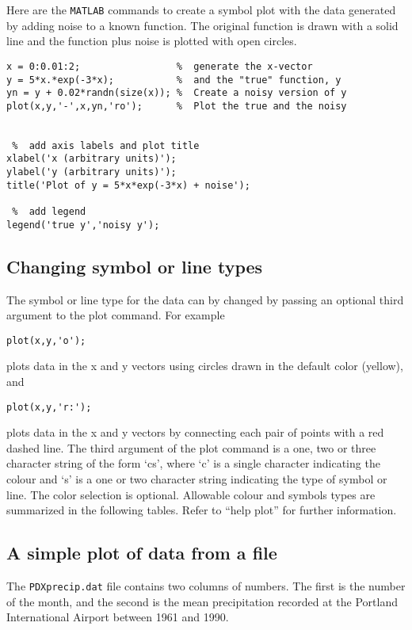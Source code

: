 \documentclass[12pt]{article}
\begin{document}
Here are the \texttt{MATLAB} commands to create a symbol plot with the data generated by adding noise to a known function. The original function is drawn with a solid line and the function plus noise is plotted with open circles.

\begin{verbatim}
x = 0:0.01:2;                 %  generate the x-vector
y = 5*x.*exp(-3*x);           %  and the "true" function, y
yn = y + 0.02*randn(size(x)); %  Create a noisy version of y
plot(x,y,'-',x,yn,'ro');      %  Plot the true and the noisy


 %  add axis labels and plot title
xlabel('x (arbitrary units)');
ylabel('y (arbitrary units)');
title('Plot of y = 5*x*exp(-3*x) + noise');

 %  add legend
legend('true y','noisy y');
\end{verbatim}

\subsection{Changing symbol or line types}

The symbol or line type for the data can by changed by passing an optional third argument to the plot command. For example

\begin{verbatim}
plot(x,y,'o');
\end{verbatim}

plots data in the x and y vectors using circles drawn in the default color (yellow), and

\begin{verbatim}
plot(x,y,'r:');
\end{verbatim}
plots data in the x and y vectors by connecting each pair of points with a red dashed line.
The third argument of the plot command is a one, two or three character string of the form `cs', where `c' is a single character indicating the colour and `s' is a one or two character string indicating the type of symbol or line. The color selection is optional. Allowable colour and symbols types are summarized in the following tables. Refer to ``help plot'' for further information.

\subsection{A simple plot of data from a file}
The \texttt{PDXprecip.dat} file contains two columns of numbers. The first is the number of the month, and the second is the mean precipitation recorded at the Portland International Airport between 1961 and 1990.
\end{document}

